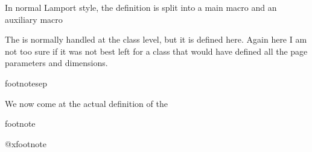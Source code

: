 In normal Lamport style, the definition is split into a main macro and an auxiliary
macro \CMDI{\textsuperscript}
%
%
The \CMDI{\footnotesep} is normally handled at the class level, but it is defined
here. Again here I am not too sure if it was not best left for a class that would have
defined all the page parameters and dimensions.

 \begin{docCommand}{footnotesep} {}
    \begin{teX}
\newdimen\footnotesep
    \end{teX}
 \end{docCommand}
%
We now come at the actual definition of the 
 \begin{docCommand}{footnote} {}
%
    \begin{teX}
\def\footnote{\@ifnextchar[\@xfootnote{\stepcounter\@mpfn
     \protected@xdef\@thefnmark{\thempfn}%
     \@footnotemark\@footnotetext}}
    \end{teX}
 \end{docCommand}
%
 \begin{docCommand}{@xfootnote} {}
    \begin{teX}
\def\@xfootnote[#1]{%
   \begingroup 
     \csname c@\@mpfn\endcsname #1\relax
     \unrestored@protected@xdef\@thefnmark{\thempfn}%
   \endgroup
   \@footnotemark\@footnotetext}
    \end{teX}
 \end{docCommand}

